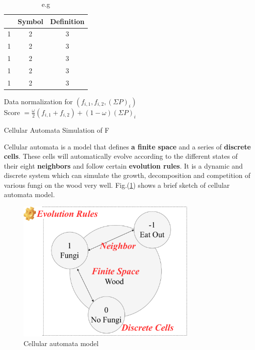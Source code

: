 \documentclass{mcmthesis}
\begin{document}
\begin{table}[H]
	\centering
	\caption{e.g}
	\begin{tabular}{|c|c|c|}
	\toprule
	  & Symbol &Definition\\
	\midrule
	1 & 2 & 3\\	
	1 & 2 & 3\\
	1 & 2 & 3\\
	1 & 2 & 3\\
	1 & 2 & 3\\
	\bottomrule
	\end{tabular}
	\label{tbl:eg1}
\end{table}


\begin{algorithm}[H]
	\SetAlgoLined
	Data normalization for $(f_{i, 1}, f_{i, 2}, (\Sigma P)_i)$ \\
	Score $= \frac{\omega}{2}(f_{i, 1} + f_{i, 2}) + (1 - \omega)(\Sigma P)_i$
	\caption{Cellular Automata Simulation of F}
\end{algorithm}

\par Cellular automata is a model that defines \textbf{a finite space} and a series of \textbf{discrete cells}. These cells will automatically evolve according to the different states of their eight \textbf{neighbors} and follow certain \textbf{evolution rules}. It is a dynamic and discrete system which can simulate the growth, decomposition and competition of various fungi on the wood very well. Fig.(\ref{f1ForCA}) shows a brief sketch of cellular automata model.

\begin{figure}[H] 
	\centering 
	\includegraphics[height=7cm]{./picture/CA.pdf}
	\caption{Cellular automata model}
	\label{f1ForCA}
\end{figure}
\end{document}

